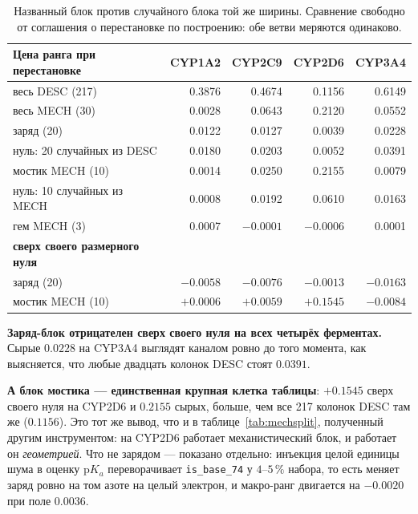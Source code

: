 \begin{table}[htbp]\centering\small
\begin{tabularx}{\textwidth}{@{}Xrrrr@{}}
\toprule
Цена ранга при перестановке & CYP1A2 & CYP2C9 & CYP2D6 & CYP3A4 \\
\midrule
весь \textsc{DESC} (217) & 0.3876 & 0.4674 & 0.1156 & 0.6149 \\
весь \textsc{MECH} (30)  & 0.0028 & 0.0643 & 0.2120 & 0.0552 \\
заряд (20)               & 0.0122 & 0.0127 & 0.0039 & 0.0228 \\
\quad нуль: 20 случайных из \textsc{DESC} & 0.0180 & 0.0203 & 0.0052 & 0.0391 \\
мостик \textsc{MECH} (10) & 0.0014 & 0.0250 & 0.2155 & 0.0079 \\
\quad нуль: 10 случайных из \textsc{MECH} & 0.0008 & 0.0192 & 0.0610 & 0.0163 \\
гем \textsc{MECH} (3)     & 0.0007 & $-0.0001$ & $-0.0006$ & 0.0001 \\
\midrule
\textbf{сверх своего размерного нуля} & & & & \\
заряд (20)                & $-0.0058$ & $-0.0076$ & $-0.0013$ & $-0.0163$ \\
мостик \textsc{MECH} (10) & $+0.0006$ & $+0.0059$ & $\mathbf{+0.1545}$ & $-0.0084$ \\
\bottomrule
\end{tabularx}
\caption{Названный блок против случайного блока той же ширины. Сравнение свободно от соглашения о
перестановке по построению: обе ветви меряются одинаково.}
\label{tab:chgperm}
\end{table}

\textbf{Заряд-блок отрицателен сверх своего нуля на всех четырёх ферментах.} Сырые $0.0228$ на
CYP3A4 выглядят каналом ровно до того момента, как выясняется, что любые двадцать колонок
\textsc{DESC} стоят $0.0391$.

\textbf{А блок мостика --- единственная крупная клетка таблицы}: $+0.1545$ сверх своего нуля на
CYP2D6 и $0.2155$ сырых, больше, чем все 217 колонок \textsc{DESC} там же ($0.1156$). Это тот же
вывод, что и в таблице~\ref{tab:mechsplit}, полученный другим инструментом: на CYP2D6 работает
механистический блок, и работает он \emph{геометрией}. Что не зарядом --- показано отдельно:
инъекция целой единицы шума в оценку $\mathrm{p}K_a$ переворачивает \texttt{is\_base\_74} у
$4$--$5\,\%$ набора, то есть меняет заряд ровно на том азоте на целый электрон, и макро-ранг
двигается на $-0.0020$ при поле $0.0036$.

